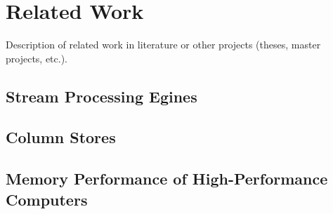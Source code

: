\section{Related Work}
\label{sec:related-work}

Description of related work in literature or other projects (theses, master projects, etc.).

\subsection{Stream Processing Egines}

\subsection{Column Stores}

\subsection{Memory Performance of High-Performance Computers}